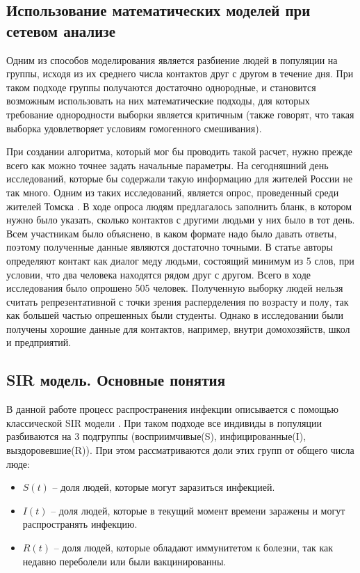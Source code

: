 \documentclass[14pt,a4paper]{article}
\begin{document}
\subsection{Использование математических моделей при сетевом анализе}

Одним из способов моделирования является разбиение людей в популяции на группы, исходя из их среднего числа контактов друг с другом в течение дня. При таком подходе группы получаются достаточно однородные, и становится возможным использовать на них математические подходы, для которых требование однородности выборки является критичным (также говорят, что такая выборка удовлетворяет условиям гомогенного смешивания).

При создании алгоритма, который мог бы проводить такой расчет, нужно прежде всего как можно точнее задать начальные параметры. На сегодняшний день исследований, которые бы содержали такую информацию для жителей России не так много. Одним из таких исследований, является опрос, проведенный среди жителей Томска \cite{Tomsk}. В ходе опроса людям предлагалось заполнить бланк, в котором нужно было указать, сколько контактов с другими людьми у них было в тот день. Всем участникам было объяснено, в каком формате надо было давать ответы, поэтому полученные данные являются достаточно точными. В статье авторы определяют контакт как диалог меду людьми, состоящий минимум из 5 слов, при условии, что два человека находятся рядом друг с другом. Всего в ходе исследования было опрошено 505 человек. Полученную выборку людей нельзя считать репрезентативной с точки зрения расперделения по возрасту и полу, так как большей частью опрешенных были студенты. Однако в исследовании были получены хорошие данные для контактов, например, внутри домохозяйств, школ и предприятий. 




\subsection{SIR модель. Основные понятия}

В данной работе процесс распространения инфекции описывается с помощью классической SIR модели \cite{Murray}. При таком подходе все индивиды в популяции разбиваются на 3 подгруппы (восприимчивые(S), инфицированные(I), выздоровевшие(R)). При этом рассматриваются доли этих групп от общего числа люде:

\begin{itemize}
		
 \item $S(t)$ -- доля людей, которые могут заразиться инфекцией.
 \item $I(t)$ -- доля людей, которые в текущий момент времени заражены и могут распространять инфекцию.
 \item $R(t)$ -- доля людей, которые обладают иммунитетом к болезни, так как недавно переболели или были вакцинированны.
  
\end{itemize}
    
\end{document}
